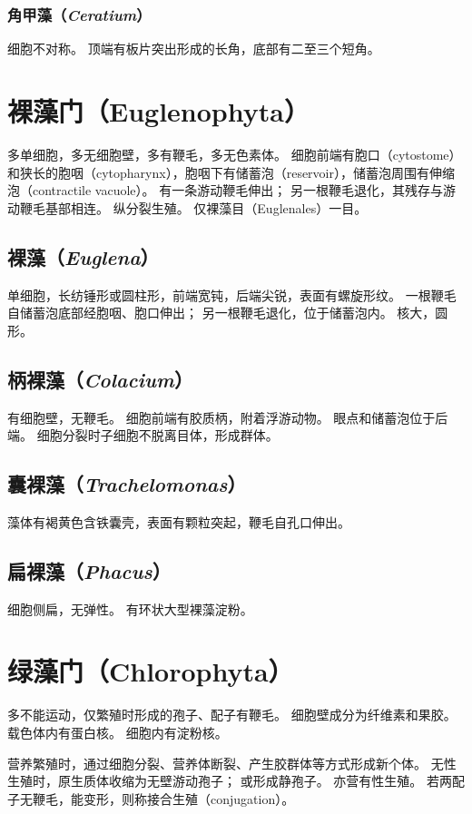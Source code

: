 \documentclass[11pt]{article}
\begin{document}
\subsubsection{角甲藻（\textit{Ceratium}）}
细胞不对称。
顶端有板片突出形成的长角，底部有二至三个短角。

\section{裸藻门（Euglenophyta）}
多单细胞，多无细胞壁，多有鞭毛，多无色素体。
细胞前端有胞口（cytostome）和狭长的胞咽（cytopharynx），胞咽下有储蓄泡（reservoir），储蓄泡周围有伸缩泡（contractile vacuole）。
有一条游动鞭毛伸出；
另一根鞭毛退化，其残存与游动鞭毛基部相连。
纵分裂生殖。
仅裸藻目（Euglenales）一目。

\subsection{裸藻（\textit{Euglena}）}
单细胞，长纺锤形或圆柱形，前端宽钝，后端尖锐，表面有螺旋形纹。
一根鞭毛自储蓄泡底部经胞咽、胞口伸出；
另一根鞭毛退化，位于储蓄泡内。
核大，圆形。

\subsection{柄裸藻（\textit{Colacium}）}
有细胞壁，无鞭毛。
细胞前端有胶质柄，附着浮游动物。
眼点和储蓄泡位于后端。
细胞分裂时子细胞不脱离目体，形成群体。

\subsection{囊裸藻（\textit{Trachelomonas}）}
藻体有褐黄色含铁囊壳，表面有颗粒突起，鞭毛自孔口伸出。

\subsection{扁裸藻（\textit{Phacus}）}
细胞侧扁，无弹性。
有环状大型裸藻淀粉。

\section{绿藻门（Chlorophyta）}
多不能运动，仅繁殖时形成的孢子、配子有鞭毛。
细胞壁成分为纤维素和果胶。
载色体内有蛋白核。
细胞内有淀粉核。

\par

营养繁殖时，通过细胞分裂、营养体断裂、产生胶群体等方式形成新个体。
无性生殖时，原生质体收缩为无壁游动孢子；
或形成静孢子。
亦营有性生殖。
若两配子无鞭毛，能变形，则称接合生殖（conjugation）。
\end{document}
